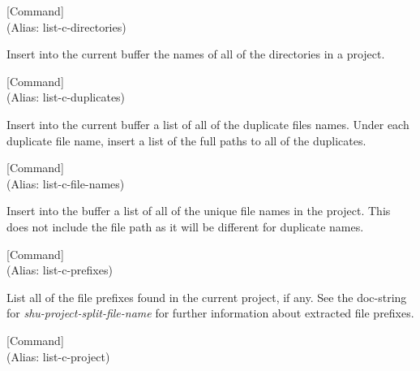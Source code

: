 \vspace{1em}
\noindent
{}
\usebox{\funcname}
 \hfill [Command]\\%
 (Alias: list-c-directories)

\begin{doc-string}
Insert into the current buffer the names of all of the directories in a project.
\end{doc-string}

\vspace{1em}
\noindent
{}
\usebox{\funcname}
 \hfill [Command]\\%
 (Alias: list-c-duplicates)

\begin{doc-string}
Insert into the current buffer a list of all of the duplicate files names.
Under each duplicate file name, insert a list of the full paths to all of the
duplicates.
\end{doc-string}

\vspace{1em}
\noindent
{}
\usebox{\funcname}
 \hfill [Command]\\%
 (Alias: list-c-file-names)

\begin{doc-string}
Insert into the buffer a list of all of the unique file names in the project.
This does not include the file path as it will be different for duplicate
names.
\end{doc-string}

\vspace{1em}
\noindent
{}
\usebox{\funcname}
 \hfill [Command]\\%
 (Alias: list-c-prefixes)

\begin{doc-string}
List all of the file prefixes found in the current project, if any.
See the doc-string for \emph{shu-project-split-file-name} for further information
about extracted file prefixes.
\end{doc-string}

\vspace{1em}
\noindent
{}
\usebox{\funcname}
 \hfill [Command]\\%
 (Alias: list-c-project)

